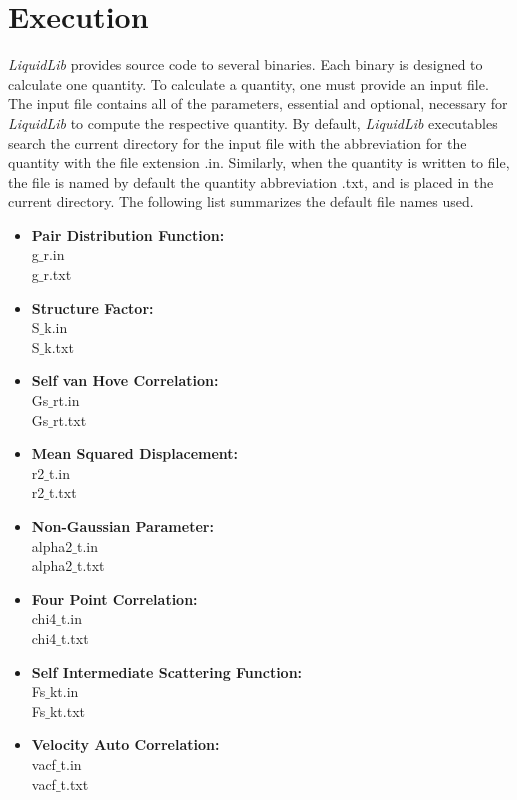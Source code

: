 \documentclass{article}
\begin{document}
\section{Execution}
\textit{LiquidLib} provides source code to several binaries.  Each binary is designed to calculate one quantity.  To calculate a quantity, one must provide an input file.  The input file contains all of the parameters, essential and optional, necessary for \textit{LiquidLib} to compute the respective quantity.  By default, \textit{LiquidLib} executables search the current directory for the input file with the abbreviation for the quantity with the file extension .in.  Similarly, when the quantity is written to file, the file is named by default the quantity abbreviation .txt, and is placed in the current directory.  The following list summarizes the default file names used.
\begin{multicols}{2} \label{input_output}
\begin{itemize}
\item \textbf{Pair Distribution Function:}
 \\g$\_$r.in
 \\g$\_$r.txt
\item \textbf{Structure Factor:}
 \\S$\_$k.in
 \\S$\_$k.txt
 \item \textbf{Self van Hove Correlation:}
 \\Gs$\_$rt.in
 \\Gs$\_$rt.txt
\item \textbf{Mean Squared Displacement:}
 \\r2$\_$t.in
 \\r2$\_$t.txt
\item \textbf{Non-Gaussian Parameter:}
 \\alpha2$\_$t.in
 \\alpha2$\_$t.txt
 \item \textbf{Four Point Correlation:}
 \\chi4$\_$t.in
 \\chi4$\_$t.txt
\item \textbf{Self Intermediate Scattering Function:}
 \\Fs$\_$kt.in
 \\Fs$\_$kt.txt
 \item \textbf{Velocity Auto Correlation:}
 \\vacf$\_$t.in
 \\vacf$\_$t.txt
\end{itemize}
\end{multicols}
\end{document}
